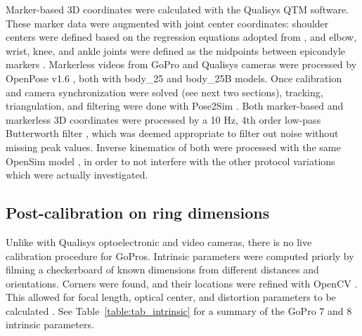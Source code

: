 Marker-based 3D coordinates were calculated with the Qualisys QTM software. These marker data were augmented with joint center coordinates: shoulder centers were defined based on the regression equations adopted from \cite{Dumas2018}, and elbow, wrist, knee, and ankle joints were defined as the midpoints between epicondyle markers \cite{Pohl2010}. Markerless videos from GoPro and Qualisys cameras were processed by OpenPose v1.6 \cite{Cao2019}, both with body\_25 and body\_25B models. Once calibration and camera synchronization were solved (see next two sections), tracking, triangulation, and filtering were done with Pose2Sim \cite{Pagnon2022b}. Both marker-based and markerless 3D coordinates were processed by a 10 Hz, 4th order low-pass Butterworth filter \cite{Butterworth1930}, which was deemed appropriate to filter out noise without missing peak values. Inverse kinematics of both were processed with the same OpenSim model \cite{Pagnon2022b}, in order to not interfere with the other protocol variations which were actually investigated.


\subsection{Post-calibration on ring dimensions}\label{calib_pnp}

Unlike with Qualisys optoelectronic and video cameras, there is no live calibration procedure for GoPros. Intrinsic parameters were computed priorly by filming a checkerboard of known dimensions from different distances and orientations. Corners were found, and their locations were refined with OpenCV \cite{Bradski2000}. This allowed for focal length, optical center, and distortion parameters to be calculated \cite{Zhang2000}. See Table~\ref{table:tab_intrinsic} for a summary of the GoPro 7 and 8 intrinsic parameters.

\begin{table}[!ht]
    \centering
    \caption{Intrinsic parameters of the GoPro 7 and GoPro 8 cameras. The optical center was assumed to be at the center of the image. Focal length was supposed to be identical in both directions, the pixel to be square and not skewed, and $6^{th}$ order radial and $2^{nd}$ order tangential distortion coefficient to be null.}
      \label{table:tab_intrinsic}
\end{table}

